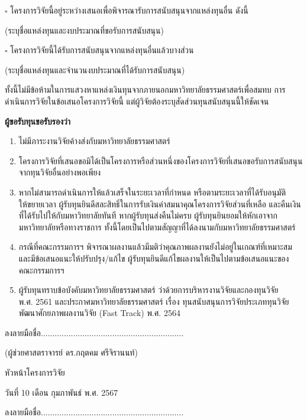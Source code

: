 \documentclass[16pt]{extarticle}
\begin{document}
$\square$ โครงการวิจัยนี้อยู่ระหว่างเสนอเพื่อพิจารณารับการสนับสนุนจากแหล่งทุนอื่น ดังนี้

\noindent\hspace{1em}(ระบุชื่อแหล่งทุนและงบประมาณที่ขอรับการสนับสนุน)

$\square$ โครงการวิจัยนี้ได้รับการสนับสนุนจากแหล่งทุนอื่นแล้วบางส่วน

\noindent\hspace{1em}(ระบุชื่อแหล่งทุนและจำนวนงบประมาณที่ได้รับการสนับสนุน)

ทั้งนี้ไม่มีข้อห้ามในการแสวงหาแหล่งเงินทุนจากภายนอกมหาวิทยาลัยธรรมศาสตร์เพื่อสมทบ
การดำเนินการวิจัยในข้อเสนอโครงการวิจัยนี้ แต่ผู้วิจัยต้องระบุสัดส่วนทุนสนับสนุนนี้ให้ชัดเจน

\textbf{ผู้ขอรับทุนขอรับรองว่า}

\begin{enumerate}
\def\labelenumi{\arabic{enumi}.}
\item
  ไม่มีภาระงานวิจัยค้างส่งกับมหาวิทยาลัยธรรมศาสตร์
\item
  โครงการวิจัยที่เสนอขอมิได้เป็นโครงการหรือส่วนหนึ่งของโครงการวิจัยที่เสนอขอรับการสนับสนุนจากทุนวิจัยอื่นอย่างพอเพียง
\item
  หากไม่สามารถดำเนินการให้แล้วเสร็จในระยะเวลาที่กำหนด หรือตามระยะเวลาที่ได้รับอนุมัติ\\
  ให้ขยายเวลา ผู้รับทุนยินดีสละสิทธิ์ในการรับเงินค่าสมนาคุณโครงการวิจัยส่วนที่เหลือ
  และคืนเงินที่ได้รับไปให้กับมหาวิทยาลัยทันที หากผู้รับทุนส่งคืนไม่ครบ
  ผู้รับทุนยินยอมให้หักเอาจากมหาวิทยาลัยหรือทางราชการ
  ทั้งนี้โดยเป็นไปตามสัญญาที่ได้ลงนามกับมหาวิทยาลัยธรรมศาสตร์
\item
  กรณีที่คณะกรรมการฯ
  พิจารณาผลงานแล้วมีมติว่าคุณภาพผลงานยังไม่อยู่ในเกณฑ์ที่เหมาะสมและมีข้อเสนอแนะให้ปรับปรุง/แก้ไข
  ผู้รับทุนยินดีแก้ไขผลงานให้เป็นไปตามข้อเสนอแนะของคณะกรรมการฯ
\item
  ผู้รับทุนทราบข้อบังคับมหาวิทยาลัยธรรมศาสตร์ ว่าด้วยการบริหารงานวิจัยและกองทุนวิจัย\\
  พ.ศ. 2561 และประกาศมหาวิทยาลัยธรรมศาสตร์ เรื่อง
  ทุนสนับสนุนการวิจัยประเภททุนวิจัยพัฒนาศักยภาพผลงานวิจัย (Fast Track) พ.ศ. 2564
\end{enumerate}

ลงลายมือชื่อ..............................................................

(ผู้ช่วยศาสตราจารย์ ดร.กฤตคม ศรีจิรานนท์)

หัวหน้าโครงการวิจัย

วันที่ 10 เดือน กุมภาพันธ์ พ.ศ. 2567

ลงลายมือชื่อ..............................................................
\end{document}
